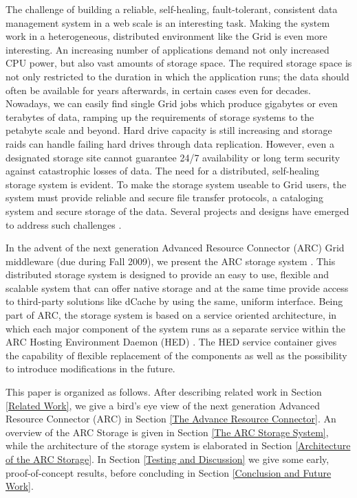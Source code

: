 \documentclass[final]{ieee}
\begin{document}
The challenge of building a reliable, self-healing, fault-tolerant,
consistent data management system in a web scale is an interesting
task. Making the system work in a heterogeneous, distributed
environment like the Grid is even more interesting. An increasing
number of applications demand not only increased CPU power, but also
vast amounts of storage space. The required storage space is not only
restricted to the duration in which the application runs; the data
should often be available for years afterwards, in certain cases even
for decades. Nowadays, we can easily find single Grid jobs which produce
gigabytes or even terabytes of data, ramping up the requirements of
storage systems to the petabyte scale and beyond. Hard drive capacity is
still increasing and storage raids can handle failing hard drives through 
data replication. However, even a designated storage site cannot guarantee 
24/7 availability or long term security against catastrophic losses of data. 
The need for a distributed, self-healing storage system is evident. To
make the storage system useable to Grid users, the system must provide
reliable and secure file transfer protocols, a cataloging system and
secure storage of the data. Several projects and designs have emerged
to address such challenges \cite{Hoschek00datamanagement,DengWang}.

In the advent of the next generation Advanced Resource Connector (ARC)
Grid middleware \cite{NorduGridsite} (due during Fall 2009), we present 
the ARC storage system \cite{ARCStoragedesigndoc}. This distributed
storage system is designed to provide an easy
to use, flexible and scalable system that can offer native storage and
at the same time provide access to third-party solutions like dCache \cite{dCache,DSSWithdCache}  by
using the same, uniform interface. Being part of ARC, the
storage system is based on a service
oriented architecture, in which each major component of the
system runs as a separate service within the ARC Hosting Environment
Daemon (HED) \cite{HEDdesigndoc}. The HED service container gives the
capability of flexible replacement of the components as well as the
possibility to introduce modifications in the future. %

This paper is organized as follows. After describing
related work in Section \ref{Related Work}, we give a bird's eye
view of the next generation Advanced Resource Connector (ARC) in
Section \ref{The Advance Resource Connector}. An overview of the
ARC Storage is given in Section \ref{The ARC Storage System}, while
the architecture of the storage system is elaborated in Section
\ref{Architecture of the ARC Storage}. In Section \ref{Testing and
  Discussion} we give some early, proof-of-concept results, before 
concluding in Section \ref{Conclusion and Future Work}. 
\end{document}
